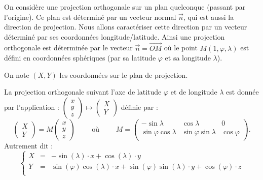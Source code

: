\documentclass[11pt,class=report,crop=false]{standalone}
\begin{document}
On considère une projection orthogonale sur un plan quelconque (passant par l'origine). Ce plan est déterminé par un vecteur normal $\vec n$, qui est aussi la direction de projection. 
Nous allons caractériser cette direction par un vecteur déterminé par ses coordonnées longitude/latitude. Ainsi une projection orthogonale est déterminée par le vecteur $\vec n = \overrightarrow{OM}$ où le point $M(1,\varphi,\lambda)$ est défini en coordonnées sphériques (par sa latitude $\varphi$ et sa longitude $\lambda$).



On note $(X,Y)$ les coordonnées sur le plan de projection.

\begin{proposition}
La projection orthogonale suivant l'axe de latitude $\varphi$ et de longitude $\lambda$ est donnée par l'application : 
$\left(\begin{smallmatrix}x\\y\\z\end{smallmatrix}\right)
\mapsto \left(\begin{smallmatrix}X\\Y\end{smallmatrix}\right)$ définie par :
$$\begin{pmatrix}X\\Y\end{pmatrix} = M \begin{pmatrix}x\\y\\z\end{pmatrix}
\qquad \text{ où } \qquad 
M = \begin{pmatrix}
-\sin\lambda & \cos\lambda & 0\\
\sin\varphi\cos\lambda&\sin\varphi\sin\lambda&\cos\varphi\\
\end{pmatrix}.
$$
Autrement dit :
$$\left\{
\begin{array}{rcl}
X &=& -\sin(\lambda) \cdot x + \cos(\lambda) \cdot y \\
Y &=& \sin(\varphi)\cos(\lambda) \cdot x +\sin(\varphi)\sin(\lambda) \cdot y + \cos(\varphi) \cdot z \\
\end{array}
\right.$$
\end{proposition}
\end{document}
